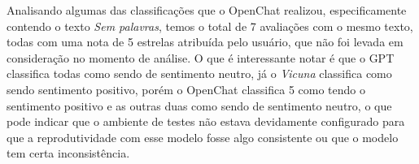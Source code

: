 Analisando algumas das classificações que o OpenChat realizou, especificamente contendo o texto \textit{Sem palavras}, temos o total de 7 avaliações com o mesmo texto, todas com uma nota de 5 estrelas atribuída pelo usuário, que não foi levada em consideração no momento de análise. O que é interessante notar é que o GPT classifica todas como sendo de sentimento neutro, já o \textit{Vicuna} classifica como sendo sentimento positivo, porém o OpenChat classifica 5 como tendo o sentimento positivo e as outras duas como sendo de sentimento neutro, o que pode indicar que o ambiente de testes não estava devidamente configurado para que a reprodutividade com esse modelo fosse algo consistente ou que o modelo tem certa inconsistência.
